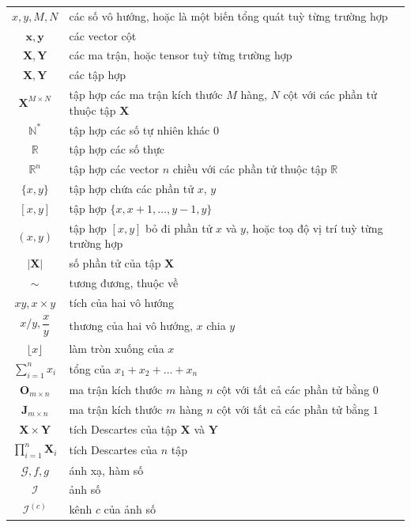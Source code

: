 \documentclass[a4paper, 12pt]{report}
\begin{document}
\begin{center}
\begin{tabular}{c|l}
    $x, y, M, N$ & các số vô hướng, hoặc là một biến tổng quát tuỳ từng trường hợp\\
    $\mathbf{x}, \mathbf{y}$ & các vector cột\\
    $\mathbf{X}, \mathbf{Y}$ & các ma trận, hoặc tensor tuỳ từng trường hợp\\
    $\bm{X}, \bm{Y}$ & các tập hợp\\
    $\bm{X}^{M \times N}$ & tập hợp các ma trận kích thước $M$ hàng, $N$ cột với các phần tử thuộc tập $\bm{X}$\\
    $\mathbb{N}^*$ & tập hợp các số tự nhiên khác $0$\\
    $\mathbb{R}$ & tập hợp các số thực\\
    $\mathbb{R}^n$ & tập hợp các vector $n$ chiều với các phần tử thuộc tập $\mathbb{R}$\\
    $\{x, y\}$ & tập hợp chứa các phần tử $x$, $y$\\
    $[x, y]$ & tập hợp $\{x, x + 1, \dots, y - 1, y\}$\\
    $(x, y)$ & tập hợp $[x, y]$ bỏ đi phần tử $x$ và $y$, hoặc toạ độ vị trí tuỳ từng trường hợp\\
    $\left|\bm{X}\right|$ & số phần tử của tập $\bm{X}$\\
    $\sim$ & tương đương, thuộc về\\
    $xy, x \times y$ & tích của hai vô hướng\\
    $x / y, \dfrac{x}{y}$ & thương của hai vô hướng, $x$ chia $y$\\
    $\lfloor x \rfloor$ & làm tròn xuống của $x$\\
    $\sum_{i=1}^nx_i$ & tổng của $x_1 + x_2 + \dots + x_n$\\
    $\mathbf{O}_{m \times n}$ & ma trận kích thước $m$ hàng $n$ cột với tất cả các phần tử bằng $0$\\
    $\mathbf{J}_{m \times n}$ & ma trận kích thước $m$ hàng $n$ cột với tất cả các phần tử bằng $1$\\
    $\bm{X} \times \bm{Y}$ & tích Descartes của tập $\bm{X}$ và $\bm{Y}$\\
    $\prod_{i=1}^n\bm{X}_i$ & tích Descartes của $n$ tập\\
    $\mathcal{G}, f, g$ & ánh xạ, hàm số\\
    $\mathcal{I}$ & ảnh số\\
    $\mathcal{I}^{\left(c\right)}$ & kênh $c$ của ảnh số\\

\end{tabular}
\end{center}
\end{document}
